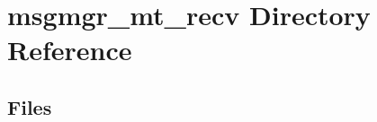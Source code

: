 \section{msgmgr\+\_\+mt\+\_\+recv Directory Reference}
\label{dir_83cbf086cc1efe20c8ee3d9f6d6bdf77}
\subsection*{Files}
\begin{DoxyCompactItemize}
\end{DoxyCompactItemize}
